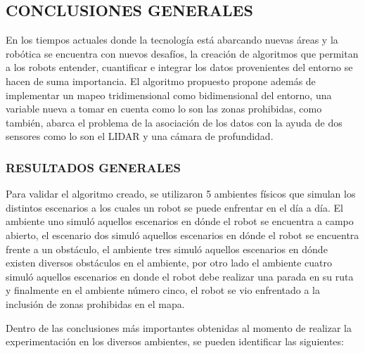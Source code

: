 
\subsection{CONCLUSIONES GENERALES}
En los tiempos actuales donde la tecnología está abarcando nuevas áreas y la robótica se encuentra con nuevos desafíos, la creación de algoritmos que permitan a los robots entender, cuantificar e integrar los datos provenientes del entorno se hacen de suma importancia. El algoritmo propuesto propone además de implementar un mapeo tridimensional como bidimensional del entorno, una variable nueva a tomar en cuenta como lo son las zonas prohibidas, como también, abarca el problema de la asociación de los datos con la ayuda de dos sensores como lo son el LIDAR y una cámara de profundidad.

\subsubsection{RESULTADOS GENERALES}
Para validar el algoritmo creado, se utilizaron 5 ambientes físicos que simulan los distintos escenarios a los cuales un robot se puede enfrentar en el día a día. El ambiente uno simuló aquellos escenarios en dónde el robot se encuentra a campo abierto, el escenario dos simuló aquellos escenarios en dónde el robot se encuentra frente a un obstáculo, el ambiente tres simuló aquellos escenarios en dónde existen diversos obstáculos en el ambiente, por otro lado el ambiente cuatro simuló aquellos escenarios en donde el robot debe realizar una parada en su ruta y finalmente en el ambiente número cinco, el robot se vio enfrentado a la inclusión de zonas prohibidas en el mapa.

Dentro de las conclusiones más importantes obtenidas al momento de realizar la experimentación en los diversos ambientes, se pueden identificar las siguientes: 

